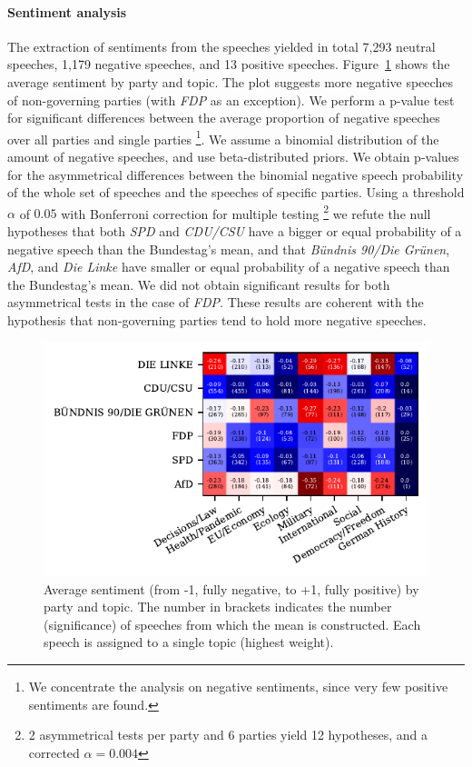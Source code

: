 \documentclass{article}
\begin{document}
\paragraph{Sentiment analysis}
The extraction of sentiments from the speeches yielded in total 7,293 neutral speeches, 1,179 negative speeches, and 13 positive speeches.
Figure~\ref{sentiments_plot} shows the average sentiment by party and topic.
The plot suggests more negative speeches of non-governing parties (with \textit{FDP} as an exception).
We perform a p-value test for significant differences between the average proportion of negative speeches over all parties and single parties
\footnote{We concentrate the analysis on negative sentiments, since very few positive sentiments are found.}.
We assume a binomial distribution of the amount of negative speeches, and use beta-distributed priors.
We obtain p-values for the asymmetrical differences between the binomial negative speech probability of the whole set of speeches and the speeches of specific parties.
Using a threshold $\alpha$ of $0.05$ with Bonferroni correction for multiple testing
\footnote{2 asymmetrical tests per party and 6 parties yield 12 hypotheses, and a corrected $\alpha=0.004$}
we refute the null hypotheses that both \textit{SPD} and \textit{CDU/CSU} have a bigger or equal probability of a negative speech than the Bundestag's mean,
and that \textit{Bündnis 90/Die Grünen}, \textit{AfD}, and \textit{Die Linke} have smaller or equal probability of a negative speech than the Bundestag's mean.
We did not obtain significant results for both asymmetrical tests in the case of \textit{FDP}.
These results are coherent with the hypothesis that non-governing parties tend to hold more negative speeches.

\begin{figure}
  \centering
  \includegraphics[width=0.9\linewidth]{images/sentiments_confusion.pdf}
  \captionsetup{width=0.9\linewidth}
  \caption{
    Average sentiment (from -1, fully negative, to +1, fully positive) by party and topic.
    The number in brackets indicates the number (significance) of speeches from which the mean is constructed.
    Each speech is assigned to a single topic (highest weight).
  }
  \label{sentiments_plot}
\end{figure}
\end{document}

